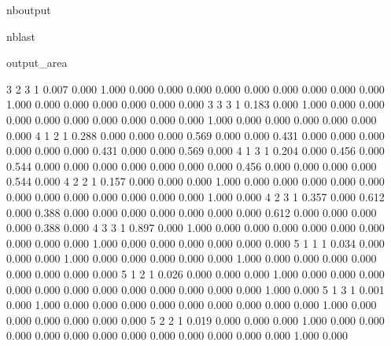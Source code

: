 \documentclass[letterpaper,10pt,english]{sphinxmanual}
\begin{document}
\begin{sphinxuseclass}{nboutput}
\begin{sphinxuseclass}{nblast}
{\begin{sphinxuseclass}{output_area}
\begin{sphinxuseclass}{}
\begin{sphinxVerbatim}[commandchars=\\\{\}]
  3  2  3  1      0.007  0.000  1.000  0.000  0.000  0.000  0.000  0.000  0.000  0.000  0.000  0.000  1.000  0.000  0.000  0.000  0.000  0.000  0.000
  3  3  3  1      0.183  0.000  1.000  0.000  0.000  0.000  0.000  0.000  0.000  0.000  0.000  0.000  1.000  0.000  0.000  0.000  0.000  0.000  0.000
  4  1  2  1      0.288  0.000  0.000  0.000  0.569  0.000  0.000  0.431  0.000  0.000  0.000  0.000  0.000  0.000  0.431  0.000  0.000  0.569  0.000
  4  1  3  1      0.204  0.000  0.456  0.000  0.544  0.000  0.000  0.000  0.000  0.000  0.000  0.000  0.456  0.000  0.000  0.000  0.000  0.544  0.000
  4  2  2  1      0.157  0.000  0.000  0.000  1.000  0.000  0.000  0.000  0.000  0.000  0.000  0.000  0.000  0.000  0.000  0.000  0.000  1.000  0.000
  4  2  3  1      0.357  0.000  0.612  0.000  0.388  0.000  0.000  0.000  0.000  0.000  0.000  0.000  0.612  0.000  0.000  0.000  0.000  0.388  0.000
  4  3  3  1      0.897  0.000  1.000  0.000  0.000  0.000  0.000  0.000  0.000  0.000  0.000  0.000  1.000  0.000  0.000  0.000  0.000  0.000  0.000
  5  1  1  1      0.034  0.000  0.000  0.000  1.000  0.000  0.000  0.000  0.000  0.000  1.000  0.000  0.000  0.000  0.000  0.000  0.000  0.000  0.000
  5  1  2  1      0.026  0.000  0.000  0.000  1.000  0.000  0.000  0.000  0.000  0.000  0.000  0.000  0.000  0.000  0.000  0.000  0.000  1.000  0.000
  5  1  3  1      0.001  0.000  1.000  0.000  0.000  0.000  0.000  0.000  0.000  0.000  0.000  0.000  1.000  0.000  0.000  0.000  0.000  0.000  0.000
  5  2  2  1      0.019  0.000  0.000  0.000  1.000  0.000  0.000  0.000  0.000  0.000  0.000  0.000  0.000  0.000  0.000  0.000  0.000  1.000  0.000
\end{sphinxVerbatim}



\end{sphinxuseclass}
\end{sphinxuseclass}
}

\end{sphinxuseclass}
\end{sphinxuseclass}
\end{document}
